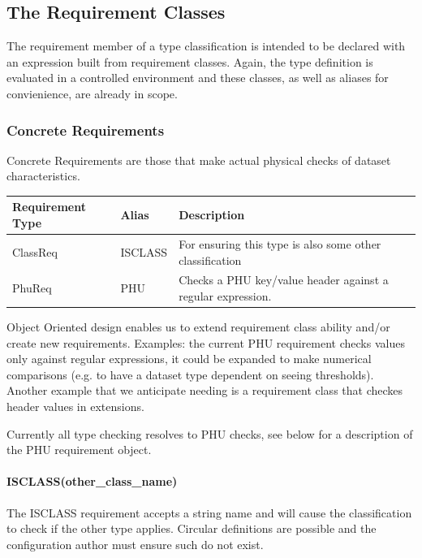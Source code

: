 \documentclass[letterpaper,10pt,english]{sphinxmanual}
\begin{document}
\subsection{The Requirement Classes}
\label{creatingAnAstroDataType:the-requirement-classes}
The requirement member of a type classification is intended to be declared
with an expression built from requirement classes.  Again, the type definition
is evaluated in a controlled environment and these classes, as well as aliases
for convienience, are already in scope.


\subsubsection{Concrete Requirements}
\label{creatingAnAstroDataType:concrete-requirements}
Concrete Requirements are those that make actual physical checks of dataset characteristics.

\begin{tabulary}{\linewidth}{|L|L|L|}
\hline
\textbf{
Requirement Type
} & \textbf{
Alias
} & \textbf{
Description
}\\\hline

ClassReq
 & 
ISCLASS
 & 
For ensuring this type is also some other
classification
\\\hline

PhuReq
 & 
PHU
 & 
Checks a PHU key/value header against a regular
expression.
\\\hline
\end{tabulary}


Object Oriented design enables us to extend requirement class ability and/or create new
requirements.  Examples: the current PHU requirement checks values only against
regular expressions, it could be expanded to make numerical comparisons (e.g. to
have a dataset type dependent on seeing thresholds). Another example that we
anticipate needing is a requirement class that checkes header values in extensions.

Currently all type checking resolves to PHU checks, see below for
a description of the PHU requirement object.


\paragraph{ISCLASS(other\_class\_name)}
\label{creatingAnAstroDataType:isclass-other-class-name}
The ISCLASS requirement accepts a string name and will cause the classification to check
if the other type applies.  Circular definitions are possible and the configuration author
must ensure such do not exist.
\end{document}

